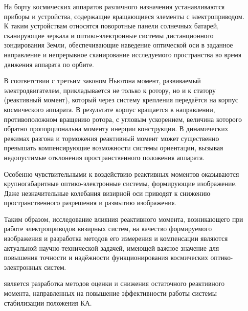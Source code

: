 
{\actuality} На борту космических аппаратов различного назначения устанавливаются приборы и устройства, содержащие вращающиеся элементы с электроприводом. К таким устройствам относятся поворотные панели солнечных батарей, сканирующие зеркала и оптико-электронные системы дистанционного зондирования Земли, обеспечивающие наведение оптической оси в заданное направление и непрерывное сканирование исследуемого пространства во время движения аппарата по орбите.

В соответствии с третьим законом Ньютона момент, развиваемый электродвигателем, прикладывается не только к ротору, но и к статору (реактивный момент), который через систему крепления передаётся на корпус космического аппарата. В результате корпус вращается в направлении, противоположном вращению ротора, с угловым ускорением, величина которого обратно пропорциональна моменту инерции конструкции. В динамических режимах разгона и торможения реактивный момент может существенно превышать компенсирующие возможности системы ориентации, вызывая недопустимые отклонения пространственного положения аппарата.

Особенно чувствительными к воздействию реактивных моментов оказываются крупногабаритные оптико-электронные системы, формирующие изображение. Даже незначительные колебания визирной оси приводят к снижению пространственного разрешения и размытию изображения.

Таким образом, исследование влияния реактивного момента, возникающего при работе электроприводов визирных систем, на качество формируемого изображения и разработка методов его измерения и компенсации являются актуальной научно-технической задачей, имеющей важное значение для повышения точности и надёжности функционирования космических оптико-электронных систем. 



{\aim}  является разработка методов оценки и снижения остаточного реактивного момента, направленных на повышение эффективности работы системы стабилизации положения КА.

